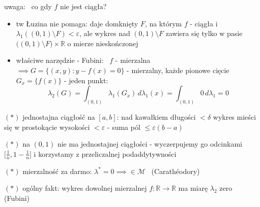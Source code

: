 \documentclass[a4paper,12pt]{article}
\begin{document}
\smallskip
uwaga: \, co gdy \(f\) nie jest ciągła?
\begin{itemize}
    \item tw Łuzina nie pomaga: daje domknięty \(F\), na którym \(f\) - ciągła i \(\lambda_1((0, 1) \setminus F) < \varepsilon\), ale wykres nad \((0, 1) \setminus F\) zawiera się tylko w pasie \(\big((0, 1) \setminus F\big) \times \mathbb{R}\) o mierze nieskończonej
    \item właściwe narzędzie - Fubini: \, \(f\) - mierzalna \(\implies G = \{(x, y) : y - f(x) = 0\}\) - mierzalny, \; każde pionowe cięcie \(G_x = \{f(x)\}\) - jeden punkt:
    \[
    \lambda_2(G) = \int_{(0, 1)} \lambda_1(G_x) \, d\lambda_1(x) = \int_{(0, 1)} 0 \, d\lambda_1 = 0
    \]
\end{itemize}

\bigskip
\((*)\) \; jednostajna ciągłość na \([a, b]\): nad kawałkiem długości \(< \delta\) wykres mieści się w prostokącie wysokości \(< \varepsilon\) - suma pól \(\leq \varepsilon(b - a)\)

\smallskip
\((*)\) \; na \((0, 1)\) nie ma jednostajnej ciągłości - wyczerpujemy go odcinkami \(\big[\frac{1}{n}, 1 - \frac{1}{n}\big]\) i korzystamy z przeliczalnej podaddytywności

\smallskip
\((*)\) \; mierzalność za darmo: \(\lambda^* = 0 \implies \in \mathcal{M}\) \, (Carathéodory)

\smallskip
\((*)\) \; ogólny fakt: wykres dowolnej mierzalnej \(f: \mathbb{R} \to \mathbb{R}\) ma miarę \(\lambda_2\) zero \, (Fubini)
\end{document}
